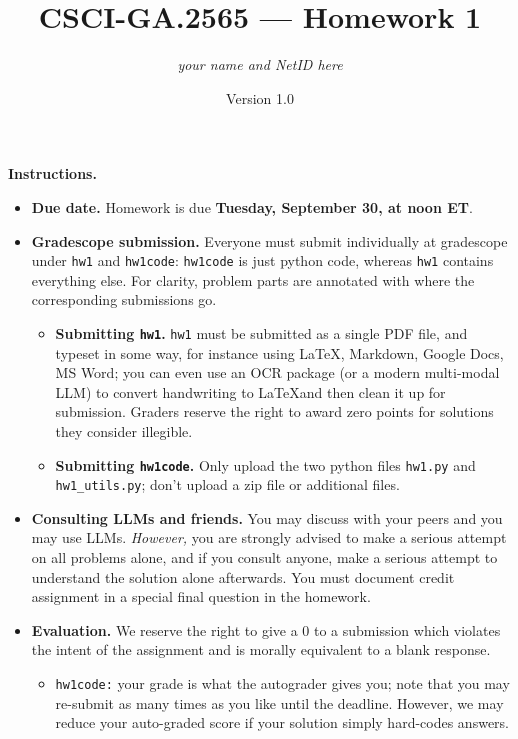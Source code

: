 \documentclass{article}
\title{CSCI-GA.2565 --- Homework 1}
\author{\emph{your name and NetID here}}
\date{Version 1.0}
\theoremstyle{definition}
\theoremstyle{remark}
\begin{document}
  \maketitle

  \noindent\textbf{Instructions.}
  \begin{itemize}
    \item
      \textbf{Due date.}
      Homework is due \textbf{Tuesday, September 30, at noon ET}.

    \item
      \textbf{Gradescope submission.}
      Everyone must submit individually at gradescope under \texttt{hw1} and \texttt{hw1code}:
      \texttt{hw1code} is just python code, whereas \texttt{hw1} contains everything else.
      For clarity, problem parts are annotated with where the corresponding submissions go.


      \begin{itemize}
        \item
          \textbf{Submitting \texttt{hw1}.}
          \texttt{hw1} must be submitted as a single PDF file, and typeset in some way,
          for instance using \LaTeX, Markdown, Google Docs, MS Word; you can even use an OCR
          package (or a modern multi-modal LLM) to convert handwriting to \LaTeX and then clean
          it up for submission.  Graders reserve the right to award zero points for
          solutions they consider illegible.

        \item
          \textbf{Submitting \texttt{hw1code}.}
          Only upload the two python files \texttt{hw1.py} and \texttt{hw1\_utils.py};
          don't upload a zip file or additional files.

      \end{itemize}

    \item
      \textbf{Consulting LLMs and friends.}
      You may discuss with your peers and you may use LLMs.  \emph{However,} you are strongly
      advised to make a serious attempt on all problems alone, and if you consult anyone,
      make a serious attempt to understand the solution alone afterwards.
      You must document credit assignment in a special final question in the homework.

    \item
      \textbf{Evaluation.}
      We reserve the right to give a 0 to a submission which violates the intent of the assignment
      and is morally equivalent to a blank response.
      \begin{itemize}
        \item
          \texttt{hw1code:} your grade is what the autograder gives you;
          note that you may re-submit as many times as you like until the deadline.
          However, we may reduce your auto-graded score if your solution simply hard-codes answers.


\end{itemize}
\end{itemize}
\end{document}
